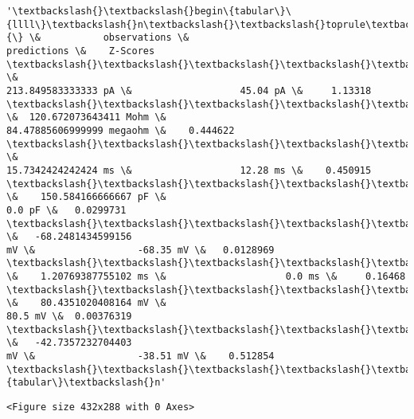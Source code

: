 \documentclass[11pt]{article}
\begin{document}
            \begin{tcolorbox}[breakable, size=fbox, boxrule=.5pt, pad at break*=1mm, opacityfill=0]
\begin{Verbatim}[commandchars=\\\{\}]
'\textbackslash{}\textbackslash{}begin\{tabular\}\{llll\}\textbackslash{}n\textbackslash{}\textbackslash{}toprule\textbackslash{}n\{\} \&           observations \&
predictions \&    Z-Scores \textbackslash{}\textbackslash{}\textbackslash{}\textbackslash{}\textbackslash{}n\textbackslash{}\textbackslash{}midrule\textbackslash{}nRheobaseTest                   \&
213.849583333333 pA \&                   45.04 pA \&     1.13318
\textbackslash{}\textbackslash{}\textbackslash{}\textbackslash{}\textbackslash{}nInputResistanceTest            \&  120.672073643411 Mohm \&
84.47885606999999 megaohm \&    0.444622 \textbackslash{}\textbackslash{}\textbackslash{}\textbackslash{}\textbackslash{}nTimeConstantTest               \&
15.7342424242424 ms \&                   12.28 ms \&    0.450915
\textbackslash{}\textbackslash{}\textbackslash{}\textbackslash{}\textbackslash{}nCapacitanceTest                \&    150.584166666667 pF \&
0.0 pF \&   0.0299731 \textbackslash{}\textbackslash{}\textbackslash{}\textbackslash{}\textbackslash{}nRestingPotentialTest           \&   -68.2481434599156
mV \&                  -68.35 mV \&   0.0128969 \textbackslash{}\textbackslash{}\textbackslash{}\textbackslash{}\textbackslash{}nInjectedCurrentAPWidthTest
\&    1.20769387755102 ms \&                     0.0 ms \&     0.16468
\textbackslash{}\textbackslash{}\textbackslash{}\textbackslash{}\textbackslash{}nInjectedCurrentAPAmplitudeTest \&    80.4351020408164 mV \&
80.5 mV \&  0.00376319 \textbackslash{}\textbackslash{}\textbackslash{}\textbackslash{}\textbackslash{}nInjectedCurrentAPThresholdTest \&   -42.7357232704403
mV \&                  -38.51 mV \&    0.512854
\textbackslash{}\textbackslash{}\textbackslash{}\textbackslash{}\textbackslash{}n\textbackslash{}\textbackslash{}bottomrule\textbackslash{}n\textbackslash{}\textbackslash{}end\{tabular\}\textbackslash{}n'
\end{Verbatim}
\end{tcolorbox}
        
    
    \begin{verbatim}
<Figure size 432x288 with 0 Axes>
    \end{verbatim}

    
    \begin{center}
    \end{center}
    { \hspace*{\fill} \\}
    
\end{document}
